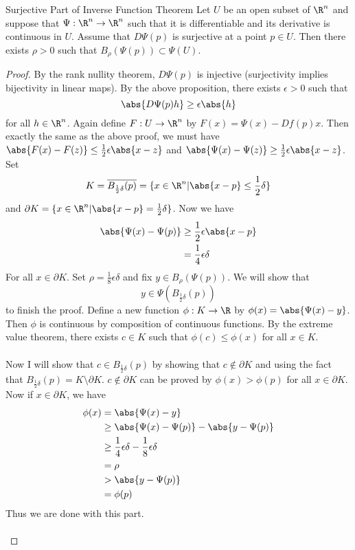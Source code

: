 \documentclass[a4paper]{article}
\begin{document}
\begin{prp}{Surjective Part of Inverse Function Theorem}{} Let $U$ be an open subset of $\R^n$ and suppose that $\Psi:\R^n\to\R^n$ such that it is differentiable and its derivative is continuous in $U$. Assume that $D\Psi(p)$ is surjective at a point $p\in U$. Then there exists $\rho>0$ such that $B_\rho(\Psi(p))\subset\Psi(U)$. 
\begin{proof}
By the rank nullity theorem, $D\Psi(p)$ is injective (surjectivity implies bijectivity in linear maps). By the above proposition, there exists $\epsilon>0$ such that $$\abs{D\Psi(p)h}\geq\epsilon\abs{h}$$ for all $h\in\R^n$. Again define $F:U\to\R^n$ by $F(x)=\Psi(x)-Df(p)x$. Then exactly the same as the above proof, we must have $\abs{F(x)-F(z)}\leq\frac{1}{2}\epsilon\abs{x-z}$ and $\abs{\Psi(x)-\Psi(z)}\geq\frac{1}{2}\epsilon\abs{x-z}$. Set $$K=\overline{B_{\frac{1}{2}\delta}(p)}=\{x\in\R^n|\abs{x-p}\leq\frac{1}{2}\delta\}$$ and $\partial K=\{x\in\R^n|\abs{x-p}=\frac{1}{2}\delta\}$. 
Now we have 
\begin{align*}
\abs{\Psi(x)-\Psi(p)}&\geq\frac{1}{2}\epsilon\abs{x-p}\\
&=\frac{1}{4}\epsilon\delta
\end{align*}
For all $x\in\partial K$. Set $\rho=\frac{1}{8}\epsilon\delta$ and fix $y\in B_\rho(\Psi(p))$. We will show that $$y\in\Psi(B_{\frac{1}{2}\delta}(p))$$ to finish the proof. Define a new function $\phi:K\to \R$ by $\phi(x)=\abs{\Psi(x)-y}$. Then $\phi$ is continuous by composition of continuous functions. By the extreme value theorem, there exists $c\in K$ such that $\phi(c)\leq\phi(x)$ for all $x\in K$. \\~\\
Now I will show that $c\in B_{\frac{1}{2}\delta}(p)$ by showing that $c\notin\partial K$ and using the fact that $B_{\frac{1}{2}\delta}(p)=K\setminus\partial{K}$. $c\notin\partial K$ can be proved by $\phi(x)>\phi(p)$ for all $x\in\partial K$. Now if $x\in\partial K$, we have
\begin{align*}
\phi(x)&=\abs{\Psi(x)-y}\\
&\geq\abs{\Psi(x)-\Psi(p)}-\abs{y-\Psi(p)}\\
&\geq\frac{1}{4}\epsilon\delta-\frac{1}{8}\epsilon\delta\\
&=\rho\\
&>\abs{y-\Psi(p)}\\
&=\phi(p)
\end{align*}
Thus we are done with this part. \\~\\

\end{proof}
\end{prp}
\end{document}
